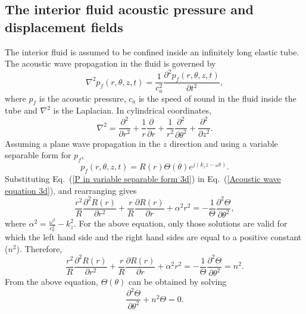 \documentclass[11pt,cleanfoot]{asme2ej}
\begin{document}
\subsection{The interior fluid acoustic pressure and displacement fields}\label{inside fluid modelling}
The interior fluid is assumed to be confined inside an infinitely long elastic tube. The acoustic wave propagation in the fluid is governed by
\begin{equation}\label{Acoustic wave equation 3d}
    \nabla^{2}p_f(r,\theta,z,t) = \frac{1}{c_a^{2}}\frac{\partial^{2} p_f(r,\theta,z,t)}{\partial t^{2}},
\end{equation}
where $p_{f}$ is the acoustic pressure, $c_a$ is the speed of sound in the fluid inside the tube and $\nabla^2$ is the Laplacian. In cylindrical coordinates,
\begin{equation}
    \nabla^2 = \frac{\partial^2}{\partial r^2} + \frac{1}{r}\frac{\partial}{\partial r} + \frac{1}{r^2}\frac{\partial^2}{\partial \theta^2} + \frac{\partial^2}{\partial z^2}.
\end{equation}
Assuming a plane wave propagation in the $z$ direction and using a variable separable form for $p_f$,
\begin{equation}\label{P in variable separable form 3d}
    p_{f}(r,\theta,z,t) = R(r)\Theta(\theta) e^{j(k_{z}z-\omega t)}.
\end{equation}
Substituting Eq.~(\ref{P in variable separable form 3d}) in Eq.~(\ref{Acoustic wave equation 3d}), and rearranging gives 
\begin{equation}
    \frac{r^2}{R}\frac{\partial^{2}R(r)}{\partial r^{2}} + \frac{r}{R}\frac{\partial R(r)}{\partial r} + \alpha^2 r^2 = -\frac{1}{\Theta}\frac{\partial^2 \Theta}{\partial \theta^2},
\end{equation}
where $\alpha^2 = \frac{\omega^{2}}{c_{a}^{2}} - k_{z}^{2}$. For the above equation, only those solutions are valid for which the left hand side and the right hand sides are equal to a positive constant ($n^2$). Therefore,
\begin{equation}\label{LHS RHS}
    \frac{r^2}{R}\frac{\partial^{2}R(r)}{\partial r^{2}} + \frac{r}{R}\frac{\partial R(r)}{\partial r} + \alpha^2 r^2 = -\frac{1}{\Theta}\frac{\partial^2 \Theta}{\partial \theta^2} = n^2.
\end{equation}
From the above equation, $\Theta(\theta)$ can be obtained by solving
\begin{equation}\label{theta governing eqn inside fluid}
    \frac{\partial^2 \Theta}{\partial \theta^2} + n^2\Theta = 0.
\end{equation}
\end{document}
